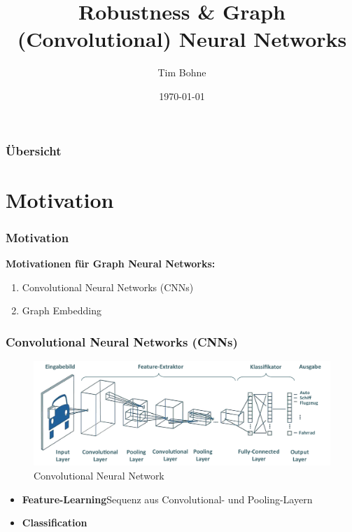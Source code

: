\documentclass{beamer}
\title[]{Robustness \& Graph (Convolutional) Neural Networks}
\author{Tim Bohne}
\institute[]
{
\textit{Machine Learning Seminar 20/21}
\medskip
}
\date{\today}
\begin{document}
\begin{frame}[plain] %
\titlepage %
\end{frame}

\begin{frame}
\frametitle{Übersicht} %
\tableofcontents
\end{frame}

\section{Motivation}

\begin{frame}
  \frametitle{Motivation}
  \textbf{Motivationen für Graph Neural Networks:}
  \begin{enumerate}
    \item Convolutional Neural Networks (CNNs)
    \item Graph Embedding
  \end{enumerate}
\end{frame}

\begin{frame}
  \frametitle{Convolutional Neural Networks (CNNs)}
  \begin{figure}
    \centering
    \includegraphics[width=\textwidth]{img/CNN.png}
    \caption*{Convolutional Neural Network \cite{Zschech2020}}
  \end{figure}
  \begin{itemize}
    \item \textbf{Feature-Learning}\newline Sequenz aus Convolutional- und Pooling-Layern
    \item \textbf{Classification}
  \end{itemize}
\end{frame}
\end{document}
